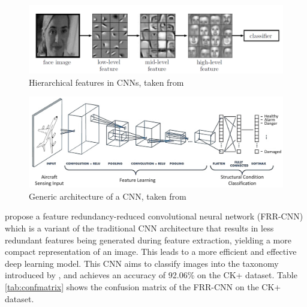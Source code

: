 \documentclass[12pt, a4paper]{article}
\begin{document}
\begin{figure}[H]
    \centering
    \includegraphics[scale=0.50]{images/cnnfe.png}
    \caption{Hierarchical features in CNNs, taken from \cite{nguyen2019facial}}
    \label{fig:cnnfe}
\end{figure}

\begin{figure}[H]
    \centering
    \includegraphics[scale=0.16]{images/cnn.png}
    \caption{Generic architecture of a CNN, taken from \cite{tabian2019convolutional}}
    \label{fig:genericcnn}
\end{figure}

\cite{xie2017facial} propose a feature redundancy-reduced convolutional neural network (FRR-CNN) which is a variant of the traditional CNN architecture that results in less redundant features being generated during feature extraction, yielding a more compact representation of an image. This leads to a more efficient and effective deep learning model. This CNN aims to classify images into the taxonomy introduced by \cite{ekman}, and achieves an accuracy of 92.06\% on the CK+ dataset. Table \ref{tab:confmatrix} shows the confusion matrix of the FRR-CNN on the CK+ dataset. 
\end{document}

